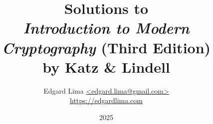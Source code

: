 \documentclass[a4paper,12pt,fleqn]{book}
\begin{document}
\author{Edgard Lima \href{mailto:edgard.lima@gmail.com}{\textless edgard.lima@gmail.com\textgreater} \\
\href{https://edgardlima.com}{https://edgardlima.com}}
\title{Solutions to \\  \textit{Introduction to Modern Cryptography} (Third Edition) \\ by Katz \& Lindell}

\date{2025}

\frontmatter
\maketitle
\tableofcontents

\mainmatter



\backmatter
\end{document}
